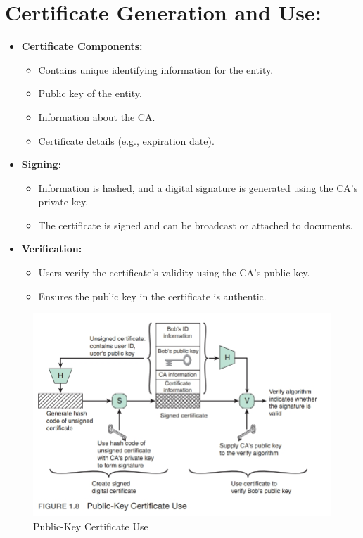 \section{Certificate Generation and Use:}
\begin{itemize}
    \item \textbf{Certificate Components:}
    \begin{itemize}
        \item Contains unique identifying information for the entity.
        \item Public key of the entity.
        \item Information about the CA.
        \item Certificate details (e.g., expiration date).
    \end{itemize}
    \item \textbf{Signing:}
    \begin{itemize}
        \item Information is hashed, and a digital signature is generated using the CA’s private key.
        \item The certificate is signed and can be broadcast or attached to documents.
    \end{itemize}
    \item \textbf{Verification:}
    \begin{itemize}
        \item Users verify the certificate's validity using the CA’s public key.
        \item Ensures the public key in the certificate is authentic.
    \end{itemize}
\end{itemize}
\begin{figure}
    \centering
    \includegraphics[width=1\linewidth]{Data_Privacy_and_Cryptography/Figures/public key certificate use.jpeg}
    \caption{Public-Key Certificate Use}
    \label{fig:enter-label}
\end{figure}
